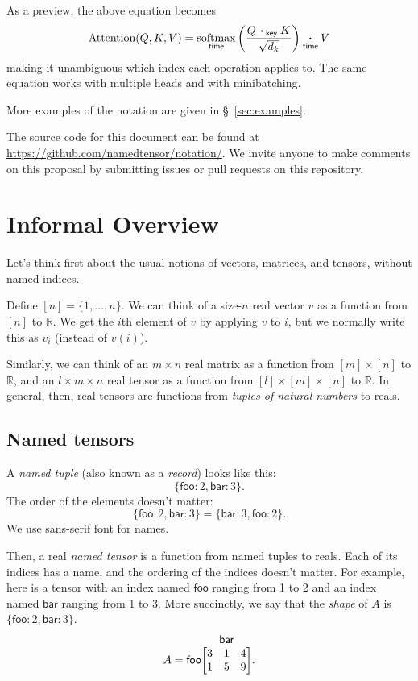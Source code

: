 \documentclass{article}
\makeatletter
\newcommand{\name}[1]{\mathsf{#1}}
\newcommand{\ndot}[1]{\mathbin{\mathop{\thinspace\boldsymbol\cdot\thinspace}\displaylimits_{\name{#1}}}}
\newcommand{\nfun}[2]{\mathop{\text{#2}}\displaylimits_{\name{#1}}}
\newcommand{\tuple}[1]{\{ #1\}}
\newcommand{\nmatrix}[3]{\name{#1}\begin{array}[b]{@{}c@{}}\name{#2}\\\begin{bmatrix}#3\end{bmatrix}\end{array}}
\makeatother
\begin{document}
As a preview, the above equation becomes
\begin{equation*}
  \text{Attention}(Q,K,V) = \nfun{time}{softmax} \left( \frac{Q \ndot{key} K}{\sqrt{d_k}} \right) \ndot{time} V
\end{equation*}
making it unambiguous which index each operation applies to. The same equation works with multiple heads and with minibatching.

More examples of the notation are given in \S~\ref{sec:examples}.

The source code for this document can be found at \url{https://github.com/namedtensor/notation/}. We invite anyone to make comments on this proposal by submitting issues or pull requests on this repository.

\section{Informal Overview}
\label{sec:intro}

Let's think first about the usual notions of vectors, matrices, and tensors, without named indices.

Define $[n] = \{1, \ldots, n\}$. We can think of a size-$n$ real vector $v$ as a function from $[n]$ to $\mathbb{R}$. We get the $i$th element of $v$ by applying $v$ to $i$, but we normally write this as $v_i$ (instead of $v(i)$). 

Similarly, we can think of an $m \times n$ real matrix as a function from $[m] \times [n]$ to $\mathbb{R}$, and an $l \times m \times n$ real tensor as a function from $[l] \times [m] \times [n]$ to $\mathbb{R}$. In general, then, real tensors are functions from \emph{tuples of natural numbers} to reals.

\subsection{Named tensors}

A \emph{named tuple} (also known as a \emph{record}) looks like this: \[\tuple{\name{foo}: 2, \name{bar}: 3}.\] The order of the elements doesn't matter: \[\tuple{\name{foo}: 2, \name{bar}: 3} = \tuple{\name{bar}: 3, \name{foo}: 2}.\] We use \textsf{sans-serif} font for names.

Then, a real \emph{named tensor} is a function from named tuples to reals. Each of its indices has a name, and the ordering of the indices doesn't matter. For example, here is a tensor with an index named $\name{foo}$ ranging from 1 to 2 and an index named $\name{bar}$ ranging from 1 to 3. More succinctly, we say that the \emph{shape} of $A$ is $\tuple{\name{foo}:2, \name{bar}:3}$.
\begin{equation*}
A = \nmatrix{foo}{bar}{
  3 & 1 & 4 \\
  1 & 5 & 9
}.
\end{equation*}
\end{document}
